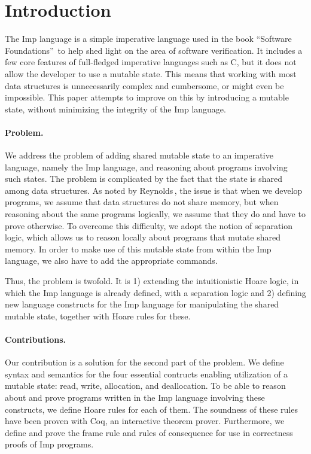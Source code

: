 \section{Introduction}
The Imp language is a simple imperative language used in the book ``Software Foundations''\,\cite{Pierce:SF} to help shed light on the area of software verification. It includes a few core features of full-fledged imperative languages such as C, but it does not allow the developer to use a mutable state. This means that working with most data structures is unnecessarily complex and cumbersome, or might even be impossible. This paper attempts to improve on this by introducing a mutable state, without minimizing the integrity of the Imp language.

\paragraph{Problem.}
We address the problem of adding shared mutable state to an imperative language, namely the Imp language, and reasoning about programs involving such states. The problem is complicated by the fact that the state is shared among data structures. As noted by Reynolds\,\cite{reynolds2008AnIntroductionTo}, the issue is that when we develop programs, we assume that data structures do not share memory, but when reasoning about the same programs logically, we assume that they do and have to prove otherwise. To overcome this difficulty, we adopt the notion of separation logic, which allows us to reason locally about programs that mutate shared memory. In order to make use of this mutable state from within the Imp language, we also have to add the appropriate commands.

Thus, the problem is twofold. It is 1) extending the intuitionistic Hoare logic, in which the Imp language is already defined, with a separation logic and 2) defining new language constructs for the Imp language for manipulating the shared mutable state, together with Hoare rules for these.

\paragraph{Contributions.}
Our contribution is a solution for the second part of the problem. We define syntax and semantics for the four essential contructs enabling utilization of a mutable state: read, write, allocation, and deallocation. To be able to reason about and prove programs written in the Imp language involving these constructs, we define Hoare rules for each of them. The soundness of these rules have been proven with Coq, an interactive theorem prover. Furthermore, we define and prove the frame rule and rules of consequence for use in correctness proofs of Imp programs.


